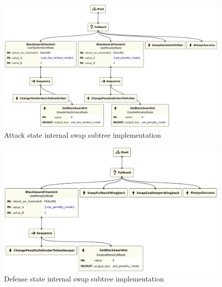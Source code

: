 \begin{figure}[!h]
    \centering
    \includegraphics[width=1.0\linewidth]{chapters/development/images/AttackSwapper.png}
    \caption{Attack state internal swap subtree implementation}
    \label{fig:attack_swapper_impl}
\end{figure}

\begin{figure}[!h]
    \centering
    \includegraphics[width=1.0\linewidth]{chapters/development/images/DefenseSwapper.png}
    \caption{Defense state internal swap subtree implementation}
    \label{fig:defense_swapper_impl}
\end{figure}
